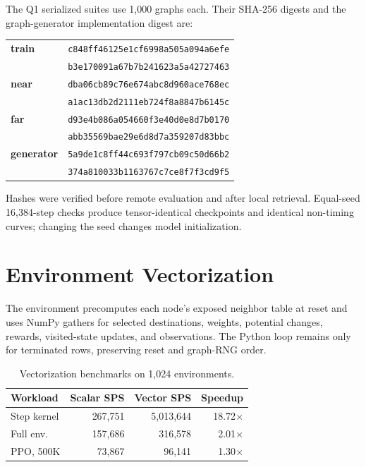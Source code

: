 \documentclass[10pt,twocolumn]{article}
\begin{document}
The Q1 serialized suites use 1,000 graphs each.  Their SHA-256 digests and the
graph-generator implementation digest are:
\begin{center}
\begin{tabular}{@{}ll@{}}
\textbf{train} & \texttt{\scriptsize c848ff46125e1cf6998a505a094a6efe}\\[-1pt]
 & \texttt{\scriptsize b3e170091a67b7b241623a5a42727463}\\[1pt]
\textbf{near} & \texttt{\scriptsize dba06cb89c76e674abc8d960ace768ec}\\[-1pt]
 & \texttt{\scriptsize a1ac13db2d2111eb724f8a8847b6145c}\\[1pt]
\textbf{far} & \texttt{\scriptsize d93e4b086a054660f3e40d0e8d7b0170}\\[-1pt]
 & \texttt{\scriptsize abb35569bae29e6d8d7a359207d83bbc}\\[1pt]
\textbf{generator} & \texttt{\scriptsize 5a9de1c8ff44c693f797cb09c50d66b2}\\[-1pt]
 & \texttt{\scriptsize 374a810033b1163767c7ce8f7f3cd9f5}\\
\end{tabular}
\end{center}
Hashes were verified before remote evaluation and after local retrieval.
Equal-seed 16,384-step checks produce tensor-identical checkpoints and
identical non-timing curves; changing the seed changes model initialization.

\section{Environment Vectorization}

The environment precomputes each node's exposed neighbor table at reset and
uses NumPy gathers for selected destinations, weights, potential changes,
rewards, visited-state updates, and observations.  The Python loop remains only
for terminated rows, preserving reset and graph-RNG order.

\begin{table}[t]
\centering
\caption{Vectorization benchmarks on 1,024 environments.}
\label{tab:vector}
\small
\begin{tabular}{@{}lrrr@{}}
\toprule
Workload & Scalar SPS & Vector SPS & Speedup\\
\midrule
Step kernel & 267,751 & 5,013,644 & 18.72$\times$\\
Full env. & 157,686 & 316,578 & 2.01$\times$\\
PPO, 500K & 73,867 & 96,141 & 1.30$\times$\\
\bottomrule
\end{tabular}
\end{table}
\end{document}
